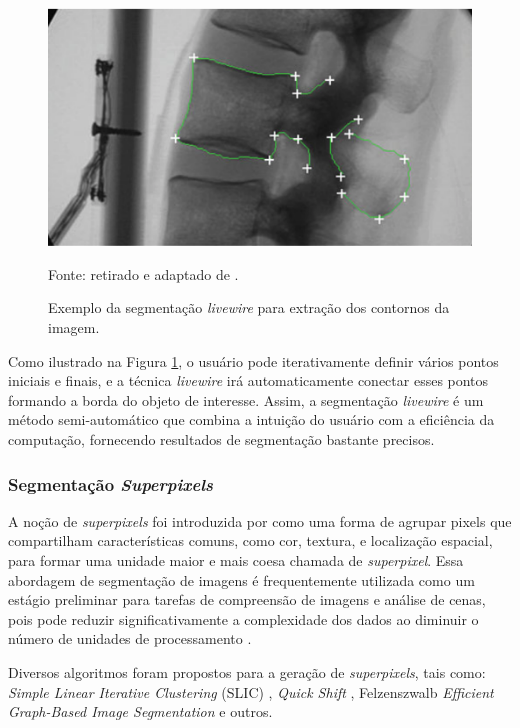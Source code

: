 \begin{figure}[H]
    \centering
    \caption{Exemplo da segmentação \textit{livewire} para extração dos contornos da imagem.}
    \label{segment:fig:livewire}
    \includegraphics[width=0.8\linewidth]{recursos/imagens/image_seg/livewire.png}
    
    Fonte: retirado e adaptado de \cite{Zheng2011ScaledFluoroscopy}.
\end{figure}

Como ilustrado na Figura \ref{segment:fig:livewire}, o usuário pode iterativamente definir vários pontos iniciais e finais, e a técnica \textit{livewire} irá automaticamente conectar esses pontos formando a borda do objeto de interesse. Assim, a segmentação \textit{livewire} é um método semi-automático que combina a intuição do usuário com a eficiência da computação, fornecendo resultados de segmentação bastante precisos.

\subsubsection{Segmentação \textit{Superpixels}}
\label{segment:superpixel}
A noção de \textit{superpixels} foi introduzida por \cite{Ren2003LearningSegmentation} como uma forma de agrupar pixels que compartilham características comuns, como cor, textura, e localização espacial, para formar uma unidade maior e mais coesa chamada de \textit{superpixel}. Essa abordagem de segmentação de imagens é frequentemente utilizada como um estágio preliminar para tarefas de compreensão de imagens e análise de cenas, pois pode reduzir significativamente a complexidade dos dados ao diminuir o número de unidades de processamento \citep{Achanta2012SLICMethods}.

Diversos algoritmos foram propostos para a geração de \textit{superpixels}, tais como: \textit{Simple Linear Iterative Clustering} (SLIC) \citep{Achanta2012SLICMethods}, \textit{Quick Shift} \citep{Vedaldi2008QuickSeeking}, Felzenszwalb \textit{Efficient Graph-Based Image Segmentation} \citep{Felzenszwalb2004EfficientSegmentation} e outros.

